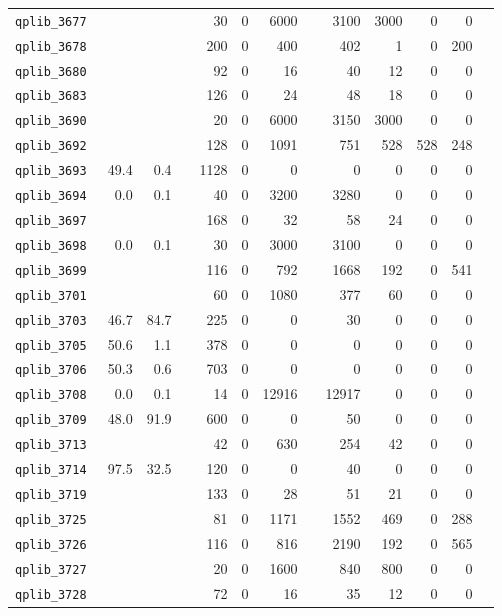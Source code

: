 {\begin{longtable}{lrrrrrrrrrrrr}
{\tt 	qplib\_3677	}	&		&		&	&	30	&	0	&	6000	&	&	3100	&	3000	&	0	&	0	\\
{\tt 	qplib\_3678	}	&		&		&	&	200	&	0	&	400	&	&	402	&	1	&	0	&	200	\\
{\tt 	qplib\_3680	}	&		&		&	&	92	&	0	&	16	&	&	40	&	12	&	0	&	0	\\
{\tt 	qplib\_3683	}	&		&		&	&	126	&	0	&	24	&	&	48	&	18	&	0	&	0	\\
{\tt 	qplib\_3690	}	&		&		&	&	20	&	0	&	6000	&	&	3150	&	3000	&	0	&	0	\\
{\tt 	qplib\_3692	}	&		&		&	&	128	&	0	&	1091	&	&	751	&	528	&	528	&	248	\\
{\tt 	qplib\_3693	}	&	49.4	&	0.4	&	&	1128	&	0	&	0	&	&	0	&	0	&	0	&	0	\\
{\tt 	qplib\_3694	}	&	0.0	&	0.1	&	&	40	&	0	&	3200	&	&	3280	&	0	&	0	&	0	\\
{\tt 	qplib\_3697	}	&		&		&	&	168	&	0	&	32	&	&	58	&	24	&	0	&	0	\\
{\tt 	qplib\_3698	}	&	0.0	&	0.1	&	&	30	&	0	&	3000	&	&	3100	&	0	&	0	&	0	\\
{\tt 	qplib\_3699	}	&		&		&	&	116	&	0	&	792	&	&	1668	&	192	&	0	&	541	\\
{\tt 	qplib\_3701	}	&		&		&	&	60	&	0	&	1080	&	&	377	&	60	&	0	&	0	\\
{\tt 	qplib\_3703	}	&	46.7	&	84.7	&	&	225	&	0	&	0	&	&	30	&	0	&	0	&	0	\\
{\tt 	qplib\_3705	}	&	50.6	&	1.1	&	&	378	&	0	&	0	&	&	0	&	0	&	0	&	0	\\
{\tt 	qplib\_3706	}	&	50.3	&	0.6	&	&	703	&	0	&	0	&	&	0	&	0	&	0	&	0	\\
{\tt 	qplib\_3708	}	&	0.0	&	0.1	&	&	14	&	0	&	12916	&	&	12917	&	0	&	0	&	0	\\
{\tt 	qplib\_3709	}	&	48.0	&	91.9	&	&	600	&	0	&	0	&	&	50	&	0	&	0	&	0	\\
{\tt 	qplib\_3713	}	&		&		&	&	42	&	0	&	630	&	&	254	&	42	&	0	&	0	\\
{\tt 	qplib\_3714	}	&	97.5	&	32.5	&	&	120	&	0	&	0	&	&	40	&	0	&	0	&	0	\\
{\tt 	qplib\_3719	}	&		&		&	&	133	&	0	&	28	&	&	51	&	21	&	0	&	0	\\
{\tt 	qplib\_3725	}	&		&		&	&	81	&	0	&	1171	&	&	1552	&	469	&	0	&	288	\\
{\tt 	qplib\_3726	}	&		&		&	&	116	&	0	&	816	&	&	2190	&	192	&	0	&	565	\\
{\tt 	qplib\_3727	}	&		&		&	&	20	&	0	&	1600	&	&	840	&	800	&	0	&	0	\\
{\tt 	qplib\_3728	}	&		&		&	&	72	&	0	&	16	&	&	35	&	12	&	0	&	0	\\

\end{longtable}}
